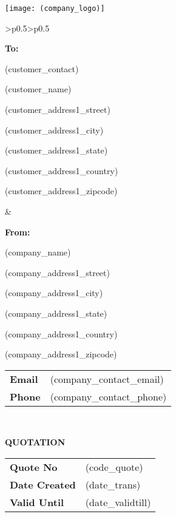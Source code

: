 \documentclass[english]{article}
\providecommand{\tabularnewline}{\\}
\begin{document}
\noindent \texttt{[image: (company\_logo)]}
		

\noindent \begin{tabular}{>{\centering}p{}>{\centering}p{}}
\noindent \begin{flushleft}
\textbf{To:}

(customer\_contact)

(customer\_name)


(customer\_address1\_street)

(customer\_address1\_city)

(customer\_address1\_state)

(customer\_address1\_country)

(customer\_address1\_zipcode)

\par\end{flushleft}
& \begin{flushleft}
\textbf{From:}

(company\_name)

(company\_address1\_street)

(company\_address1\_city)

(company\_address1\_state)

(company\_address1\_country)

(company\_address1\_zipcode)

\vspace{5mm}

\begin{tabular}{ll}
\textbf{Email} & (company\_contact\_email) \tabularnewline
\textbf{Phone} & (company\_contact\_phone) \tabularnewline
\end{tabular}

\par\end{flushleft}
\tabularnewline
\end{tabular}

\noindent \vspace{10mm}

\noindent \textbf{QUOTATION}

\noindent \vspace{10mm}


\noindent \begin{tabular}{ll}
\textbf{Quote No} & (code\_quote) \tabularnewline
\textbf{Date Created} & (date\_trans) \tabularnewline
\textbf{Valid Until} & (date\_validtill) \tabularnewline
\end{tabular}
\end{document}
